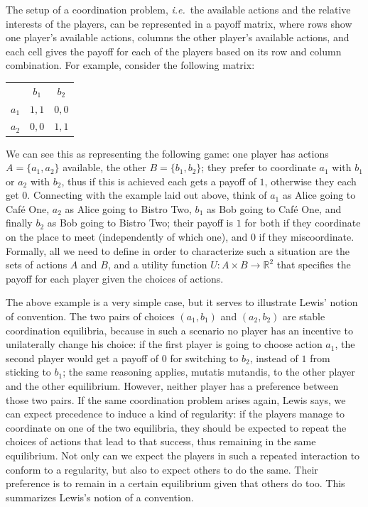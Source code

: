 \documentclass[a4paper]{article}
\begin{document}
The setup of a coordination problem, \emph{i.e.}~the available actions and the relative interests of the players, can be represented in a payoff matrix, where rows show one player's available actions, columns the other player's available actions, and each cell gives the payoff for each of the players based on its row and column combination.
For example, consider the following matrix:
\begin{center}
\begin{tabular}{r|c|c|}
\multicolumn{1}{r}{}
 & \multicolumn{1}{c}{$b_1$}
 & \multicolumn{1}{c}{$b_2$} \\ \cline{2-3}
   $a_1$ & $1,1$ & $0,0$ \\ \cline{2-3}
   $a_2$ & $0,0$ & $1,1$ \\ \cline{2-3}
\end{tabular}
\end{center}
We can see this as representing the following game: one player has actions $A = \lbrace a_1, a_2 \rbrace$ available, the other $B = \lbrace b_1, b_2 \rbrace$; they prefer to coordinate $a_1$ with $b_1$ or $a_2$ with $b_2$, thus if this is achieved each gets a payoff of $1$, otherwise they each get $0$.
Connecting with the example laid out above, think of $a_1$ as Alice going to Caf\'e One, $a_2$ as Alice going to Bistro Two, $b_1$ as Bob going to Caf\'e One, and finally $b_2$ as Bob going to Bistro Two; their payoff is $1$ for both if they coordinate on the place to meet (independently of which one), and $0$ if they miscoordinate.
Formally, all we need to define in order to characterize such a situation are the sets of actions $A$ and $B$, and a utility function $U : A \times B \rightarrow \mathbb{R}^2$ that specifies the payoff for each player given the choices of actions.

The above example is a very simple case, but it serves to illustrate Lewis' notion of convention.
The two pairs of choices $(a_1,b_1)$ and $(a_2,b_2)$ are stable coordination equilibria, because in such a scenario no player has an incentive to unilaterally change his choice: if the first player is going to choose action $a_1$, the second player would get a payoff of $0$ for switching to $b_2$, instead of $1$ from sticking to $b_1$; the same reasoning applies, mutatis mutandis, to the other player and the other equilibrium.
However, neither player has a preference between those two pairs.
If the same coordination problem arises again, Lewis says, we can expect precedence to induce a kind of regularity: if the players manage to coordinate on one of the two equilibria, they should be expected to repeat the choices of actions that lead to that success, thus remaining in the same equilibrium.
Not only can we expect the players in such a repeated interaction to conform to a regularity, but also to expect others to do the same.
Their preference is to remain in a certain equilibrium given that others do too.
This summarizes Lewis's notion of a convention.
\end{document}
